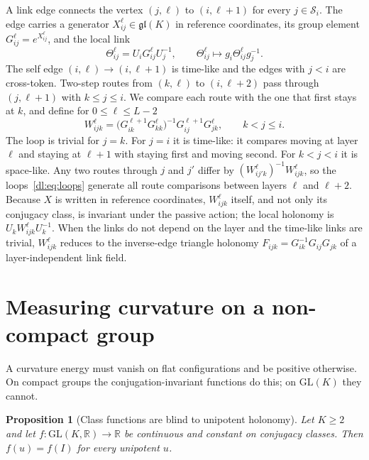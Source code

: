\documentclass[11pt]{article}
\newtheorem{proposition}[theorem]{Proposition}
\theoremstyle{definition}
\theoremstyle{remark}
\providecommand{\GL}{\mathrm{GL}}
\providecommand{\gl}{\mathfrak{gl}}
\newcommand{\R}{\mathbb R}
\begin{document}
A link edge connects the vertex $(j,\ell)$ to $(i,\ell+1)$ for every $j\in\mathcal S_i$. The edge carries a generator $X_{ij}^\ell\in\gl(K)$ in reference coordinates, its group element $G_{ij}^\ell=e^{X_{ij}^\ell}$, and the local link
\begin{equation}
\Theta_{ij}^\ell=U_iG_{ij}^\ell U_j^{-1},\qquad \Theta_{ij}^\ell\mapsto g_i\Theta_{ij}^\ell g_j^{-1}.
\label{dl:eq:link}
\end{equation}
The self edge $(i,\ell)\to(i,\ell+1)$ is time-like and the edges with $j<i$ are cross-token. Two-step routes from $(k,\ell)$ to $(i,\ell+2)$ pass through $(j,\ell+1)$ with $k\le j\le i$. We compare each route with the one that first stays at $k$, and define for $0\le\ell\le L-2$
\begin{equation}
W_{ijk}^\ell=\big(G_{ik}^{\ell+1}G_{kk}^\ell\big)^{-1}G_{ij}^{\ell+1}G_{jk}^\ell,\qquad k<j\le i.
\label{dl:eq:loops}
\end{equation}
The loop is trivial for $j=k$. For $j=i$ it is time-like: it compares moving at layer $\ell$ and staying at $\ell+1$ with staying first and moving second. For $k<j<i$ it is space-like. Any two routes through $j$ and $j'$ differ by $(W_{ij'k}^\ell)^{-1}W_{ijk}^\ell$, so the loops~\eqref{dl:eq:loops} generate all route comparisons between layers $\ell$ and $\ell+2$. Because $X$ is written in reference coordinates, $W_{ijk}^\ell$ itself, and not only its conjugacy class, is invariant under the passive action; the local holonomy is $U_kW_{ijk}^\ell U_k^{-1}$. When the links do not depend on the layer and the time-like links are trivial, $W_{ijk}^\ell$ reduces to the inverse-edge triangle holonomy $F_{ijk}=G_{ik}^{-1}G_{ij}G_{jk}$ of a layer-independent link field.

\section{Measuring curvature on a non-compact group}
\label{dl:sec:curvature}

A curvature energy must vanish on flat configurations and be positive otherwise. On compact groups the conjugation-invariant functions do this; on $\GL(K)$ they cannot.

\begin{proposition}[Class functions are blind to unipotent holonomy]
\label{dl:prop:blind}
Let $K\ge2$ and let $f:\GL(K,\R)\to\R$ be continuous and constant on conjugacy classes. Then $f(u)=f(I)$ for every unipotent $u$.
\end{proposition}
\end{document}
